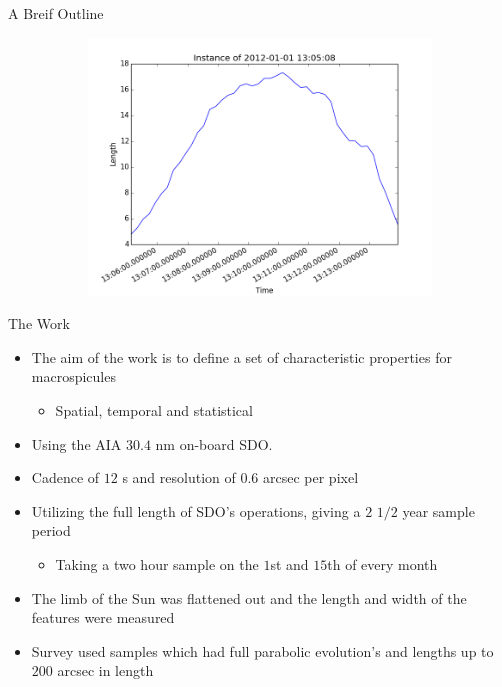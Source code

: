 \documentclass{beamer}
\begin{document}
\begin{frame}{A Breif Outline}
\begin{figure}
\begin{center}
\begin{subfigure}[b]{0.495\textwidth}
\begin{center}
					\includegraphics[width=\textwidth]{Figs/example_evo.png}
				\end{center}
			\end{subfigure}			
		\end{center}
	\end{figure}
	\end{frame}

	
	\begin{frame}{The Work}
		\begin{itemize}
			\item The aim of the work is to define a set of characteristic properties for macrospicules
				\begin{itemize}
					\item Spatial, temporal and statistical
				\end{itemize}
			\item Using the AIA $30.4$ nm on-board SDO.
			\item Cadence of $12$ s and resolution of $0.6$ arcsec per pixel 
			\item Utilizing the full length of SDO's operations, giving a $2$ $1/2$ year sample period
				\begin{itemize}
					\item Taking a two hour sample on the $1$st and $15$th of every month 
				\end{itemize}
			\item The limb of the Sun was flattened out and the length and width of the features were measured
			\item Survey used samples which had full parabolic evolution's and lengths up to $200$ arcsec in length
		\end{itemize}
	\end{frame}
\end{document}
